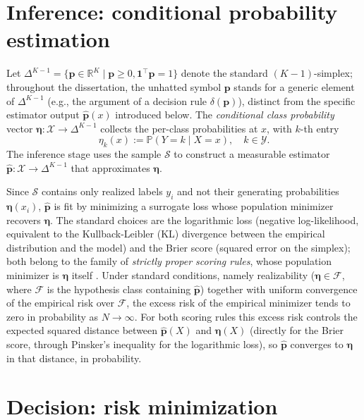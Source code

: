 \section{Inference: conditional probability estimation}\label{sec:inference}

Let $\Delta^{K-1} = \{ \mathbf{p} \in \mathbb{R}^K \mid \mathbf{p} \geq 0, \mathbf{1}^\top \mathbf{p} = 1 \}$ denote the standard $(K-1)$-simplex; throughout the dissertation, the unhatted symbol $\mathbf{p}$ stands for a generic element of $\Delta^{K-1}$ (e.g., the argument of a decision rule $\delta(\mathbf{p})$), distinct from the specific estimator output $\hat{\mathbf{p}}(x)$ introduced below. The \textit{conditional class probability} vector $\boldsymbol{\eta}: \mathcal{X} \to \Delta^{K-1}$ collects the per-class probabilities at $x$, with $k$-th entry
\begin{equation}
    \eta_k(x) := \mathbb{P}(Y=k \mid X=x), \quad k \in \mathcal{Y}.
\end{equation}
The inference stage uses the sample $\mathcal{S}$ to construct a measurable estimator $\hat{\mathbf{p}}: \mathcal{X} \to \Delta^{K-1}$ that approximates $\boldsymbol{\eta}$.

Since $\mathcal{S}$ contains only realized labels $y_i$ and not their generating probabilities $\boldsymbol{\eta}(x_i)$, $\hat{\mathbf{p}}$ is fit by minimizing a surrogate loss whose population minimizer recovers $\boldsymbol{\eta}$. The standard choices are the logarithmic loss (negative log-likelihood, equivalent to the Kullback-Leibler (KL) divergence between the empirical distribution and the model) and the Brier score (squared error on the simplex); both belong to the family of \textit{strictly proper scoring rules}, whose population minimizer is $\boldsymbol{\eta}$ itself \citep{gneiting2007strictly}. Under standard conditions, namely realizability ($\boldsymbol{\eta} \in \mathcal{F}$, where $\mathcal{F}$ is the hypothesis class containing $\hat{\mathbf{p}}$) together with uniform convergence of the empirical risk over $\mathcal{F}$, the excess risk of the empirical minimizer tends to zero in probability as $N \to \infty$. For both scoring rules this excess risk controls the expected squared distance between $\hat{\mathbf{p}}(X)$ and $\boldsymbol{\eta}(X)$ (directly for the Brier score, through Pinsker's inequality for the logarithmic loss), so $\hat{\mathbf{p}}$ converges to $\boldsymbol{\eta}$ in that distance, in probability.

\section{Decision: risk minimization}\label{sec:decision_risk}

